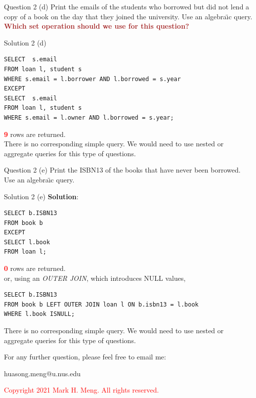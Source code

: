 \begin{frame}[fragile]{Question 2 (d)}
Print the emails of the students who borrowed but did not lend a copy of a book on the day that they joined the university. Use an algebra\"{\i}c query.\\
\vspace{10pt}
\textcolor{brown}{\textbf{Which set operation should we use for this question?}}
\end{frame}

\begin{frame}[fragile]{Solution 2 (d)}
\begin{lstlisting}
SELECT  s.email 
FROM loan l, student s 
WHERE s.email = l.borrower AND l.borrowed = s.year
EXCEPT
SELECT  s.email 
FROM loan l, student s 
WHERE s.email = l.owner AND l.borrowed = s.year;
\end{lstlisting}

\vspace{5pt}
\textcolor{red}{\textbf{9}} rows are returned.\\
\vspace{10pt}
There is no corresponding simple query. We would need to use nested or aggregate queries for this type of questions.
\end{frame}

\begin{frame}[fragile]{Question 2 (e)}
Print the ISBN13 of the books that have never been borrowed. Use an algebra\"{\i}c query.
\end{frame}

\begin{frame}[fragile]{Solution 2 (e)}
\textbf{Solution}:
\begin{lstlisting}
SELECT b.ISBN13 
FROM book b
EXCEPT
SELECT l.book 
FROM loan l;
\end{lstlisting}

\vspace{5pt}
\textcolor{red}{\textbf{0}} rows are returned.\\
\vspace{10pt}
or, using an \textit{OUTER JOIN}, which introduces NULL values,

\begin{lstlisting}
SELECT b.ISBN13 
FROM book b LEFT OUTER JOIN loan l ON b.isbn13 = l.book
WHERE l.book ISNULL;
\end{lstlisting}

There is no corresponding simple query. We would need to use nested or aggregate queries for this type of questions.

\end{frame}

\begin{frame}{}
\centering  
For any further question, please feel free to email me:\vspace{10pt}

huasong.meng@u.nus.edu \vspace{20pt}

\begin{tcolorbox}
	\begin{center}
		\textcolor{red}{Copyright 2021 Mark H. Meng. All rights reserved.}
	\end{center}
\end{tcolorbox}

\end{frame}